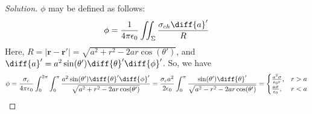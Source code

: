 \documentclass[crop=false,class=book,oneside]{standalone}
\begin{document}
            \begin{proof}[Solution]
                $\phi$ may be defined as follows:
                \begin{equation*}
                    \phi
                    =\frac{1}{4\pi\epsilon_{0}}
                    \iint_{\Sigma}\frac{\sigma_{ch}\diff{a}'}{R}
                \end{equation*}
                Here,
                $R=|\mathbf{r}-\mathbf{r}'|%
                 =\sqrt{a^2+r^2-2ar\cos(\theta')}$,
                and
                $\diff{a}'=a^2\sin(\theta')\diff{\theta}'\diff{\phi}'$.
                So, we have
                \begin{equation*}
                    \phi=\frac{\sigma_c}{4\pi\epsilon_0}
                    \int_{0}^{2\pi}\int_{0}^{\pi}
                    \frac{a^2\sin(\theta')\diff{\theta}'\diff{\phi}'}
                         {\sqrt{a^2+r^2-2ar\cos(\theta')}}
                    =\frac{\sigma_c a^2}{2\epsilon_0}
                    \int_{0}^{\pi}
                    \frac{\sin(\theta')\diff{\theta}'}
                         {\sqrt{a^2-r^2-2ar\cos(\theta')}}
                    =
                    \begin{cases}
                        \frac{a^{2}\sigma}{\epsilon_{0}r},
                        &r>a\\
                        \frac{a\sigma}{\epsilon_{0}},
                        &r<a
                    \end{cases}
                \end{equation*}
            \end{proof}
\end{document}
